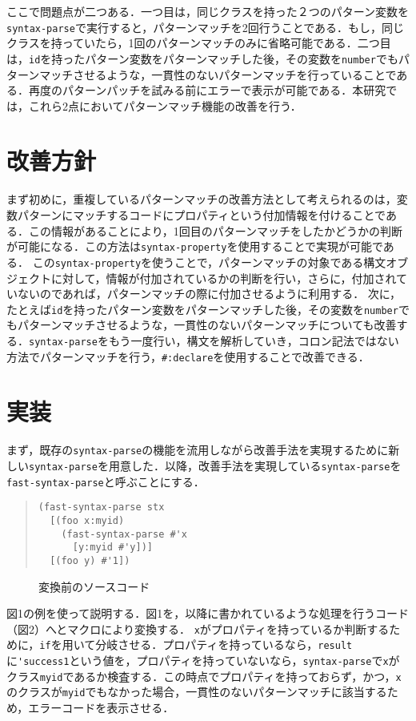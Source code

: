 \documentclass[twocolumn]{jsarticle}
\begin{document}
ここで問題点が二つある．一つ目は，同じクラスを持った２つのパターン変数を\verb|syntax-parse|で実行すると，パターンマッチを2回行うことである．もし，同じクラスを持っていたら，1回のパターンマッチのみに省略可能である．二つ目は，\verb|id|を持ったパターン変数をパターンマッチした後，その変数を\verb|number|でもパターンマッチさせるような，一貫性のないパターンマッチを行っていることである．再度のパターンパッチを試みる前にエラーで表示が可能である．本研究では，これら2点においてパターンマッチ機能の改善を行う．

\section{改善方針}
まず初めに，重複しているパターンマッチの改善方法として考えられるのは，変数パターンにマッチするコードにプロパティという付加情報を付けることである．この情報があることにより，1回目のパターンマッチをしたかどうかの判断が可能になる．この方法は\verb|syntax-property|を使用することで実現が可能である．
この\verb|syntax-property|を使うことで，パターンマッチの対象である構文オブジェクトに対して，情報が付加されているかの判断を行い，さらに，付加されていないのであれば，パターンマッチの際に付加させるように利用する．
次に，たとえば\verb|id|を持ったパターン変数をパターンマッチした後，その変数を\verb|number|でもパターンマッチさせるような，一貫性のないパターンマッチについても改善する．\verb|syntax-parse|をもう一度行い，構文を解析していき，コロン記法ではない方法でパターンマッチを行う，\verb|#:declare|を使用することで改善できる．

\section{実装}
まず，既存の\verb|syntax-parse|の機能を流用しながら改善手法を実現するために新しい\verb|syntax-parse|を用意した．以降，改善手法を実現している\verb|syntax-parse|を\verb|fast-syntax-parse|と呼ぶことにする．

\begin{quote}
\setlength{\baselineskip}{12pt}
\begin{verbatim}
(fast-syntax-parse stx
  [(foo x:myid)
    (fast-syntax-parse #'x
      [y:myid #'y])]
  [(foo y) #'1])
\end{verbatim}
\end{quote}

\begin{figure}[h]
\vspace*{-0.5cm}
    \caption{変換前のソースコード}
    \label{fig:my_label}
\end{figure}
\vspace*{-0.5cm}
図1の例を使って説明する．図1を，以降に書かれているような処理を行うコード（図2）へとマクロにより変換する．
\verb|x|がプロパティを持っているか判断するために，\verb|if|を用いて分岐させる．プロパティを持っているなら，\verb|result|に\verb|'success1|という値を，プロパティを持っていないなら，\verb|syntax-parse|で\verb|x|がクラス\verb|myid|であるか検査する．この時点でプロパティを持っておらず，かつ，\verb|x|のクラスが\verb|myid|でもなかった場合，一貫性のないパターンマッチに該当するため，エラーコードを表示させる．
\end{document}
